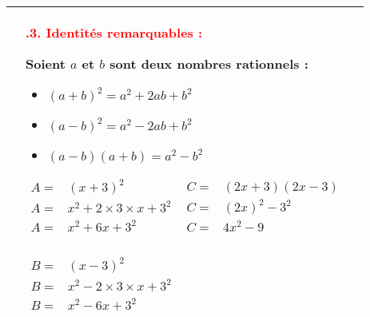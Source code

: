 \documentclass[10pt,a4paper]{article}
\newcounter{mysection}
\newcounter{mysubsection}
\newcommand{\mysubsection}[2]{
    \stepcounter{mysubsection}
    \textcolor{red}{\large \themysection.#1. #2 :}
}
\begin{document}
\begin{tabular}{|>{\centering\arraybackslash}p{1.2cm}|>{\raggedright\arraybackslash}p{15.5cm}|>{\centering\arraybackslash}p{0.8cm}|}
\hline
     & 
\vspace{0mm}
\mysubsection{3}{Identités remarquables}
\begin{Prop}
    Soient $a$ et $b$ sont deux nombres rationnels : 
    \begin{itemize}
        \item $(a+b)^2 = a^2+2ab+b^2$
        \item $(a-b)^2 = a^2-2ab+b^2$
        \item $(a-b)(a+b) = a^2-b^2$
    \end{itemize}
\end{Prop}

\begin{exemple}
     \begin{multicols}{2}
       $\begin{array}{ll}
        A = & (x+3)^2  \\
        A = & x^2 + 2\times3\times x + 3^2\\
        A = & x^2 + 6x + 3^2\\
    \end{array}$
    \vfill 
    $\begin{array}{ll}
        C = & (2x+3)(2x-3)  \\
        C = & (2x)^2 - 3^2\\
        C = & 4x^2 - 9\\
    \end{array}$
    
    $\begin{array}{ll}
        B = & (x-3)^2  \\
        B = & x^2 - 2\times3\times x + 3^2\\
        B = & x^2 - 6x + 3^2\\
    \end{array}$
  \end{multicols}
\end{exemple}
& \\
\hline
\end{tabular}
\end{document}
